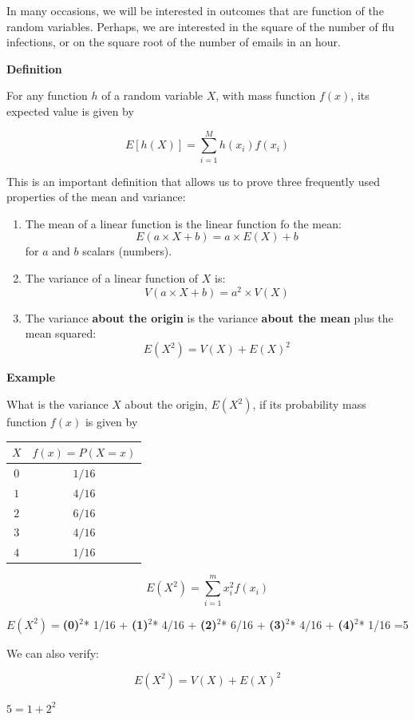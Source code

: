 \documentclass[
]{book}
\begin{document}
In many occasions, we will be interested in outcomes that are function of the random variables. Perhaps, we are interested in the square of the number of flu infections, or on the square root of the number of emails in an hour.

\textbf{Definition}

For any function \(h\) of a random variable \(X\), with mass function \(f(x)\), its expected value is given by

\[ E[h(X)]= \sum_{i=1}^M h(x_i) f(x_i) \]

This is an important definition that allows us to prove three frequently used properties of the mean and variance:

\begin{enumerate}
\def\labelenumi{\arabic{enumi})}
\item
  The mean of a linear function is the linear function fo the mean: \[E(a\times X +b)= a\times E(X) +b\] for \(a\) and \(b\) scalars (numbers).
\item
  The variance of a linear function of \(X\) is:\[V(a\times X +b)= a^2\times V(X)\]
\item
  The variance \textbf{about the origin} is the variance \textbf{about the mean} plus the mean squared: \[E(X^2)=V(X)+E(X)^2\]
\end{enumerate}

\textbf{Example}

What is the variance \(X\) about the origin, \(E(X^2)\), if its probability mass function \(f(x)\) is given by

\begin{longtable}[]{@{}cc@{}}
\toprule
\(X\) & \(f(x)=P(X=x)\) \\
\midrule
\endhead
\(0\) & \(1/16\) \\
\(1\) & \(4/16\) \\
\(2\) & \(6/16\) \\
\(3\) & \(4/16\) \\
\(4\) & \(1/16\) \\
\bottomrule
\end{longtable}

\[E(X^2) =\sum_{i=1}^m x_i^2 f(x_i)\]

\(E(X^2)=\)\textbf{(0)}\(^2\)* 1/16 + \textbf{(1)}\(^2\)* 4/16 + \textbf{(2)}\(^2\)* 6/16 + \textbf{(3)}\(^2\)* 4/16 + \textbf{(4)}\(^2\)* 1/16 =5

We can also verify:

\[E(X^2)=V(X)+E(X)^2\]

\(5=1+2^2\)
\end{document}
